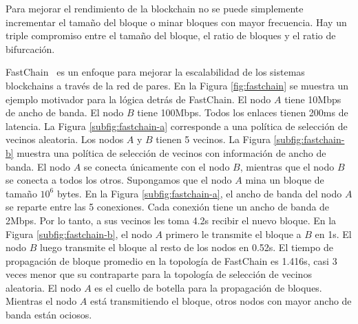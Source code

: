 Para mejorar el rendimiento de la blockchain no se puede simplemente incrementar el tamaño del bloque
o minar bloques con mayor frecuencia.
%
Hay un triple compromiso entre el tamaño del bloque, el ratio de bloques y el ratio de bifurcación.

FastChain~\cite{fastchain} es un enfoque para mejorar la escalabilidad de los sistemas blockchains
a través de la red de pares.
%
En la Figura \ref{fig:fastchain} se muestra un ejemplo motivador para la lógica detrás de FastChain.
%
El nodo $A$ tiene 10Mbps de ancho de banda.
%
El nodo $B$ tiene 100Mbps.
%
Todos los enlaces tienen 200ms de latencia.
%
La Figura \ref{subfig:fastchain-a} corresponde a una política de selección de vecinos aleatoria.
%
Los nodos $A$ y $B$ tienen 5 vecinos.
%
La Figura \ref{subfig:fastchain-b} muestra una política de selección de vecinos
con información de ancho de banda.
%
El nodo $A$ se conecta únicamente con el nodo $B$, mientras que el nodo $B$ se conecta
a todos los otros.
%
Supongamos que el nodo $A$ mina un bloque de tamaño $10^6$ bytes.
%
En la Figura \ref{subfig:fastchain-a}, el ancho de banda del nodo $A$ se reparte entre las 5 conexiones.
%
Cada conexión tiene un ancho de banda de 2Mbps.
%
Por lo tanto, a sus vecinos les toma 4.2s recibir el nuevo bloque.
%
En la Figura \ref{subfig:fastchain-b}, el nodo $A$ primero le transmite el bloque a $B$ en 1s.
%
El nodo $B$ luego transmite el bloque al resto de los nodos en 0.52s.
%
El tiempo de propagación de bloque promedio en la topología de FastChain es 1.416s,
casi 3 veces menor que su contraparte para la topología de selección de vecinos aleatoria.
%
El nodo $A$ es el cuello de botella para la propagación de bloques.
%
Mientras el nodo $A$ está transmitiendo el bloque, otros nodos con mayor ancho de banda
están ociosos.
%

